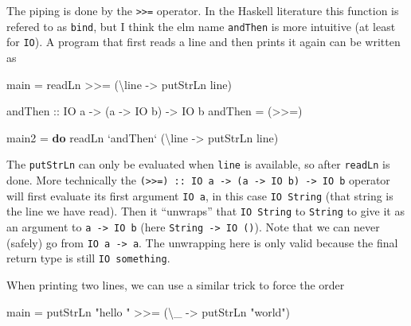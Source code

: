 \documentclass[runningheads,plain]{llncs}
\newenvironment{Shaded}{}{}
\newcommand{\KeywordTok}[1]{\textcolor[rgb]{0.00,0.44,0.13}{\textbf{#1}}}
\newcommand{\DataTypeTok}[1]{\textcolor[rgb]{0.56,0.13,0.00}{#1}}
\newcommand{\StringTok}[1]{\textcolor[rgb]{0.25,0.44,0.63}{#1}}
\newcommand{\OtherTok}[1]{\textcolor[rgb]{0.00,0.44,0.13}{#1}}
\newcommand{\FunctionTok}[1]{\textcolor[rgb]{0.02,0.16,0.49}{#1}}
\newcommand{\NormalTok}[1]{#1}
\begin{document}
The piping is done by the \texttt{\textgreater{}\textgreater{}=}
operator. In the Haskell literature this function is refered to as
\texttt{bind}, but I think the elm name \texttt{andThen} is more
intuitive (at least for \texttt{IO}). A program that first reads a line
and then prints it again can be written as

\begin{Shaded}
\begin{Highlighting}[]
\NormalTok{main }\FunctionTok{=} 
\NormalTok{    readLn }\FunctionTok{>>=}\NormalTok{ (\textbackslash{}line }\OtherTok{->}\NormalTok{ putStrLn line)}

\OtherTok{andThen ::} \DataTypeTok{IO}\NormalTok{ a }\OtherTok{->}\NormalTok{ (a }\OtherTok{->} \DataTypeTok{IO}\NormalTok{ b) }\OtherTok{->} \DataTypeTok{IO}\NormalTok{ b}
\NormalTok{andThen }\FunctionTok{=}\NormalTok{ (}\FunctionTok{>>=}\NormalTok{)}

\NormalTok{main2 }\FunctionTok{=} \KeywordTok{do}
\NormalTok{    readLn }\OtherTok{`andThen`}\NormalTok{ (\textbackslash{}line }\OtherTok{->}\NormalTok{ putStrLn line)}
\end{Highlighting}
\end{Shaded}

The \texttt{putStrLn} can only be evaluated when \texttt{line} is
available, so after \texttt{readLn} is done. More technically the
\texttt{(\textgreater{}\textgreater{}=)\ ::\ IO\ a\ -\textgreater{}\ (a\ -\textgreater{}\ IO\ b)\ -\textgreater{}\ IO\ b}
operator will first evaluate its first argument \texttt{IO\ a}, in this
case \texttt{IO\ String} (that string is the line we have read). Then it
``unwraps'' that \texttt{IO\ String} to \texttt{String} to give it as an
argument to \texttt{a\ -\textgreater{}\ IO\ b} (here
\texttt{String\ -\textgreater{}\ IO\ ()}). Note that we can never
(safely) go from \texttt{IO\ a\ -\textgreater{}\ a}. The unwrapping here
is only valid because the final return type is still
\texttt{IO\ something}.

When printing two lines, we can use a similar trick to force the order

\begin{Shaded}
\begin{Highlighting}[]
\NormalTok{main }\FunctionTok{=} 
\NormalTok{    putStrLn }\StringTok{"hello "} \FunctionTok{>>=}\NormalTok{ (\textbackslash{}_ }\OtherTok{->}\NormalTok{ putStrLn }\StringTok{"world"}\NormalTok{)}
\end{Highlighting}
\end{Shaded}
\end{document}
